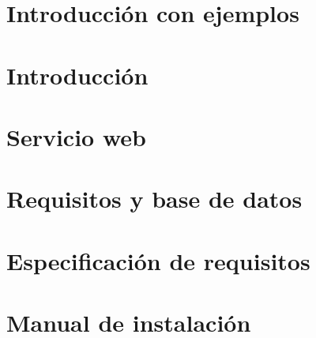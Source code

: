 \documentclass[11pt,a4paper]{article}
\begin{document}
\newpage

\clearpage
\thispagestyle{empty}
\tableofcontents


\newpage


\section{Introducci\'on con ejemplos}


\newpage
\section{Introducci\'on}


\newpage
\section{Servicio web}


\newpage
\section{Requisitos y base de datos}



\newpage
{\small


}


\newpage
\appendix

\section{Especificación de requisitos} \label{app:Req}


\newpage
\section{Manual de instalación}



\newpage
\appendix


%
\end{document}
